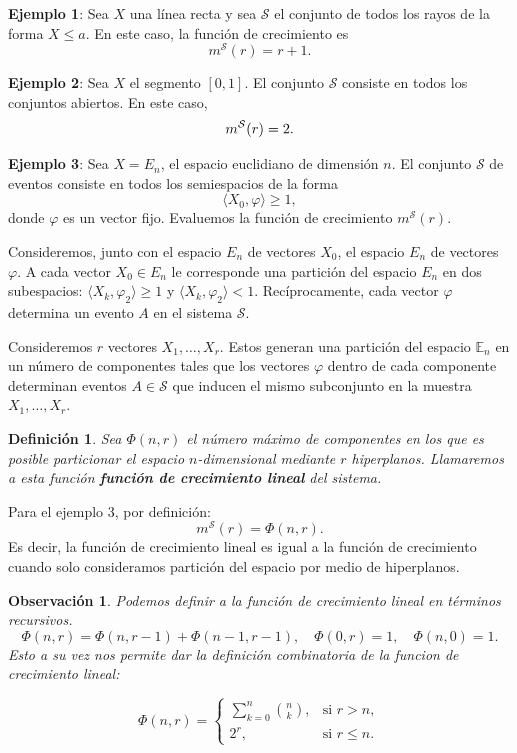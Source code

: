 \documentclass{article}
\newtheorem{dfn}{Definición}[subsection]
\newtheorem{obs}{Observación}[subsection]
\begin{document}
\textbf{Ejemplo 1}: Sea \( X \) una línea recta y sea \( \mathcal{S} \) el conjunto 
de todos los rayos de la forma \( X \leq a \). En este caso, la función de crecimiento es  
\[
m^{\mathcal{S}}(r) = r + 1.
\]

\textbf{Ejemplo 2}: Sea \( X \) el segmento \([0,1]\). El conjunto \( \mathcal{S} \) 
consiste en todos los conjuntos abiertos. En este caso,  
\[
m^{\mathcal{S}}(r) = 2.\newline
\]

\textbf{Ejemplo 3}: Sea \( X = E_n \), el espacio euclidiano de dimensión \( n \). 
El conjunto \( \mathcal{S} \) de eventos consiste en todos los semiespacios de la forma  
\[
\langle X_0, \varphi \rangle \geq 1,
\]  
donde \( \varphi \) es un vector fijo. Evaluemos la función de crecimiento \( m^{\mathcal{S}}(r) \).

Consideremos, junto con el espacio \( E_n \) de vectores \( X_0 \), el espacio \( E_n \) 
de vectores \( \varphi \). A cada vector \( X_0 \in E_n \) le corresponde una partición 
del espacio \( E_n \) en dos subespacios: \(\langle X_k, \varphi_2 \rangle \geq 1\) y \(\langle X_k, \varphi_2 \rangle < 1\). 
Recíprocamente, cada vector \(\varphi\) determina un evento $A$ en el sistema \(\mathcal{S}\).\newline

Consideremos \( r \) vectores \( X_1, \dots, X_r \). Estos generan una partición del espacio \( \mathbb{E}_n \) 
en un número de componentes tales que los vectores \( \varphi \) dentro de cada componente determinan eventos 
\( A \in \mathcal{S} \) que inducen el mismo subconjunto en la muestra \( X_1, \dots, X_r \).\newline

\begin{dfn}
    Sea \( \Phi(n, r) \) el número máximo de componentes en los que es posible particionar el espacio \( n \)-dimensional 
mediante \( r \) hiperplanos. Llamaremos a esta función \textbf{función de crecimiento lineal} del sistema.
\end{dfn}


Para el ejemplo 3, por definición:
\[
    m^{\mathcal{S}}(r) = \Phi(n, r).
\]
Es decir, la función de crecimiento lineal es igual a la función de crecimiento cuando solo consideramos partición
del espacio por medio de hiperplanos.

\begin{obs}
Podemos definir a la función de crecimiento lineal en términos recursivos. 
\[
    \Phi(n, r) = \Phi(n, r - 1) + \Phi(n - 1, r - 1),\quad \Phi(0, r) = 1, \quad \Phi(n, 0) = 1.
\]
Esto a su vez nos permite dar la definición combinatoria de la funcion de crecimiento lineal:

\[
\Phi(n, r) =
\begin{cases}
\sum\limits_{k=0}^{n} \binom{n}{k}, & \text{si } r > n, \\
2^r, & \text{si } r \leq n.
\end{cases}
\]
\end{obs}
\end{document}
